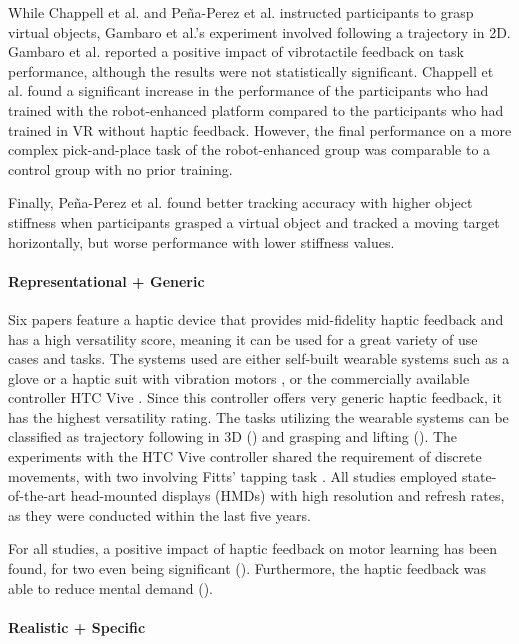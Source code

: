 While Chappell et al. and Peña-Perez et al. instructed participants to grasp virtual objects, Gambaro et al.'s experiment involved following a trajectory in 2D. Gambaro et al. reported a positive impact of vibrotactile feedback on task performance, although the results were not statistically significant. 
Chappell et al. found a significant increase in the performance of the participants who had trained with the robot-enhanced platform compared to the participants who had trained in VR without haptic feedback. However, the final performance on a more complex pick-and-place task of the robot-enhanced group was comparable to a control group with no prior training. 

Finally, Peña-Perez et al. found better tracking accuracy with higher object stiffness when participants grasped a virtual object and tracked a moving target horizontally, but worse performance with lower stiffness values.


\paragraph{Representational + Generic} \label{sec:representationalgeneric}
Six papers feature a haptic device that provides mid-fidelity haptic feedback and has a high versatility score, meaning it can be used for a great variety of use cases and tasks. The systems used are either self-built wearable systems such as a glove \cite{LiuH2019, Trinitatova2023} or a haptic suit with vibration motors \cite{Xia2023}, or the commercially available controller HTC Vive \cite{Vasudevan2020, Yang2023, McAnally2023}. Since this controller offers very generic haptic feedback, it has the highest versatility rating. 
The tasks utilizing the wearable systems can be classified as trajectory following in 3D (\cite{Trinitatova2023, Xia2023}) and grasping and lifting (\cite{LiuH2019}). The experiments with the HTC Vive controller shared the requirement of discrete movements, with two involving Fitts' tapping task \cite{Fitts1954TheMovement}. All studies employed state-of-the-art head-mounted displays (HMDs) with high resolution and refresh rates, as they were conducted within the last five years.

For all studies, a positive impact of haptic feedback on motor learning has been found, for two even being significant (\cite{LiuH2019, Yang2023}). Furthermore, the haptic feedback was able to reduce mental demand (\cite{Trinitatova2023, Yang2023}).

\paragraph{Realistic + Specific} \label{sec:realisticspecific}


